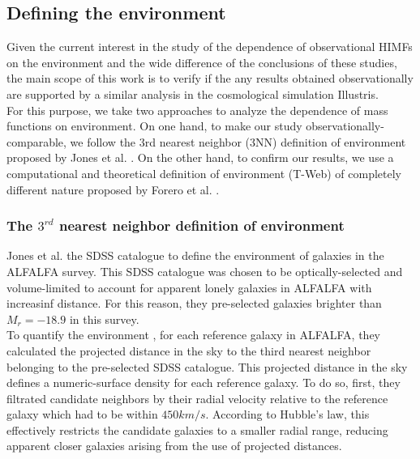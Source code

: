 \documentclass[a4paper,fleqn,usenatbib]{mnras}
\begin{document}
 

\subsection{Defining the environment}

Given the current interest in the study of the dependence of observational HIMFs on the environment and the wide difference of the conclusions of these studies, the main scope of this work is to verify if the any results obtained observationally are supported by a similar analysis in the cosmological simulation Illustris.\\

For this purpose, we take two approaches to analyze the dependence of mass functions on environment. 
On one hand, to make our study observationally-comparable, we follow the 3rd nearest neighbor (3NN) definition of environment proposed by Jones et al. \cite{Jones2016}. 
On the other hand, to confirm our results, we use a computational and theoretical definition of environment (T-Web) of completely different nature proposed by Forero et al. \cite{Forero2009}. 

\subsubsection{The $3^{rd}$ nearest neighbor definition of environment}

Jones et al. \cite{Jones2016} the SDSS \cite{SDSS2011} catalogue to define the environment of galaxies in the ALFALFA \cite{ALFALFA} survey.
This SDSS catalogue was chosen to be optically-selected and volume-limited to account for apparent lonely galaxies in ALFALFA with increasinf distance. 
For this reason, they pre-selected galaxies brighter than $M_r = -18.9$ in this survey.\\

To quantify the environment , for each reference galaxy in ALFALFA, they calculated the projected distance in the sky to the third nearest neighbor belonging to the pre-selected SDSS catalogue.
This projected distance in the sky defines a numeric-surface density for each reference galaxy.
To do so, first, they filtrated candidate neighbors by their radial velocity relative to the reference galaxy which had to be within $450km/s$.
According to Hubble's law, this effectively restricts the candidate galaxies to a smaller radial range, reducing apparent closer galaxies arising from the use of projected distances. \\
\end{document}
